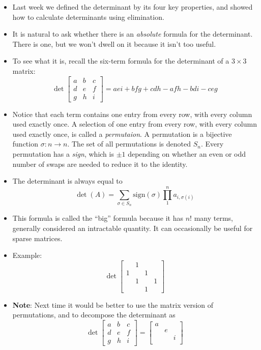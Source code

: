 \documentclass[11pt,oneside]{amsbook}
\theoremstyle{definition}
\theoremstyle{plain}
\theoremstyle{definition}
\theoremstyle{remark}
\numberwithin{equation}{section}
\numberwithin{figure}{section}
\begin{document}
\begin{itemize}
\item Last week we defined the determinant by its four key properties, and showed how to calculate determinants using elimination.
\item It is natural to ask whether there is an \emph{absolute} formula for the determinant. There is one, but we won't dwell on it because it isn't too useful.
\item To see what it is, recall the six-term formula for the determinant of a $3\times3$ matrix:
  \[\det\begin{bmatrix}a&b&c\\d&e&f\\g&h&i\end{bmatrix}
    =aei+bfg+cdh-afh-bdi-ceg
  \]
\item Notice that each term contains one entry from every row, with every column used exactly once. A selection of one entry from every row, with every column used exactly once, is called a \emph{permutaion}. A permutation is a bijective function $\sigma\colon n\to n$. The set of all permutations is denoted $S_n$. Every permutation has a \emph{sign}, which is $\pm1$ depending on whether an even or odd number of swaps are needed to reduce it to the identity.
\item The determinant is always equal to
  \[\det(A)=
    \sum_{\sigma\in S_n}\mathrm{sign}(\sigma)\prod_1^na_{i,\sigma(i)}
  \]
\item This formula is called the ``big'' formula because it has $n!$ many terms, generally considered an intractable quantity. It can occasionally be useful for sparse matrices.
\item Example:
  \[\det\begin{bmatrix}&1&&\\1&&1\\&1&&1\\&&1\end{bmatrix}
  \]
\item \textbf{Note}: Next time it would be better to use the matrix version of permutations, and to decompose the determinant as
  \[\det\begin{bmatrix}a&b&c\\d&e&f\\g&h&i\end{bmatrix}
    =\begin{bmatrix}a\\&e\\&&i\\\end{bmatrix}
\]
\end{itemize}
\end{document}
